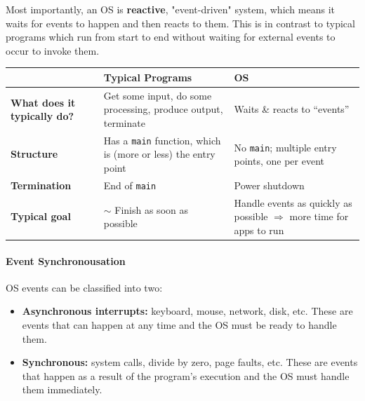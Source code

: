 \documentclass[openany,12pt]{book}
\begin{document}
\vspace{1em}
Most importantly, an OS is \textbf{reactive}, "event-driven" system, which means it waits for events to happen and then reacts to them. This is in contrast to typical programs which run from start to end without waiting for external events to occur to invoke them.

\begin{center}
  \begin{tabular}{|>{\raggedright\arraybackslash}p{4.5cm}
    |>{\raggedright\arraybackslash}p{6.5cm}
    |>{\raggedright\arraybackslash}p{5.5cm}|}
    \hline
    \rowcolor{blue!30}
     & \textbf{Typical Programs}                                                    & \textbf{OS} \\
    \hline
    \textbf{What does it typically do?}
     & Get some input, do some processing, produce output, terminate
     & Waits \& reacts to ``events''                                                              \\
    \hline
    \textbf{Structure}
     & Has a \texttt{main} function, which is (more or less) the entry point
     & No \texttt{main}; multiple entry points, one per event                                     \\
    \hline
    \textbf{Termination}
     & End of \texttt{main}
     & Power shutdown                                                                             \\
    \hline
    \textbf{Typical goal}
     & $\sim$ Finish as soon as possible
     & Handle events as quickly as possible $\Rightarrow$ more time for apps to run               \\
    \hline
  \end{tabular}
\end{center}

\paragraph{Event Synchronousation} OS events can be classified into two:
\begin{itemize}
  \item \textbf{Asynchronous interrupts:} keyboard, mouse, network, disk, etc. These are events that can happen at any time and the OS must be ready to handle them.
  \item \textbf{Synchronous:} system calls, divide by zero, page faults, etc. These are events that happen as a result of the program's execution and the OS must handle them immediately.
\end{itemize}
\end{document}
